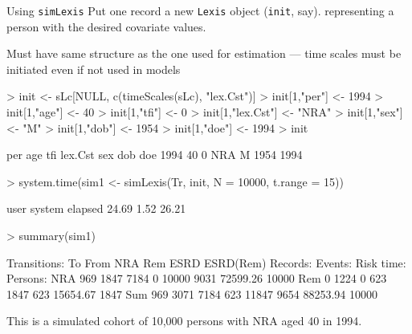 \begin{frame}{Using \texttt{simLexis}}
Put one record a new \texttt{Lexis} object (\texttt{init}, say).
representing a person with the desired covariate values.

Must have same structure as the one used for estimation --- time
scales must be initiated even if not used in models\\[-1ex]
\begin{Schunk}
\begin{Sinput}
> init <- sLc[NULL, c(timeScales(sLc), "lex.Cst")]
> init[1,"per"] <- 1994
> init[1,"age"] <- 40
> init[1,"tfi"] <- 0
> init[1,"lex.Cst"] <- "NRA"
> init[1,"sex"] <- "M"
> init[1,"dob"] <- 1954
> init[1,"doe"] <- 1994
> init
\end{Sinput}
\begin{Soutput}
  per age tfi lex.Cst sex  dob  doe
 1994  40   0     NRA   M 1954 1994
\end{Soutput}
\begin{Sinput}
> system.time(sim1 <- simLexis(Tr, init, N = 10000, t.range = 15))
\end{Sinput}
\begin{Soutput}
   user  system elapsed 
  24.69    1.52   26.21 
\end{Soutput}
\begin{Sinput}
> summary(sim1)
\end{Sinput}
\begin{Soutput}
Transitions:
     To
From  NRA  Rem ESRD ESRD(Rem)  Records:  Events: Risk time:  Persons:
  NRA 969 1847 7184         0     10000     9031   72599.26     10000
  Rem   0 1224    0       623      1847      623   15654.67      1847
  Sum 969 3071 7184       623     11847     9654   88253.94     10000
\end{Soutput}
\end{Schunk}
\pause
This is a simulated cohort of 10,000 persons with NRA aged 40 in 1994.
\end{frame}

